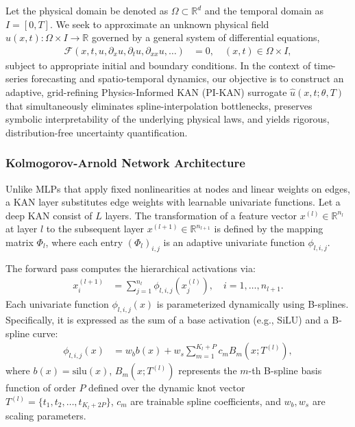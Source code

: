 \documentclass[10pt,twocolumn]{article}
\begin{document}
Let the physical domain be denoted as $\Omega \subset \mathbb{R}^d$ and the temporal domain as $I = [0, T]$. We seek to approximate an unknown physical field $u(x, t): \Omega \times I \to \mathbb{R}$ governed by a general system of differential equations,
\begin{equation}
\begin{aligned}
\mathcal{F}\left( x, t, u, \partial_x u, \partial_t u, \partial_{xx} u, \dots \right) &= 0, 
\quad (x,t) \in \Omega \times I,
\end{aligned}
\end{equation}
subject to appropriate initial and boundary conditions. In the context of time-series forecasting and spatio-temporal dynamics, our objective is to construct an adaptive, grid-refining Physics-Informed KAN (PI-KAN) surrogate $\hat{u}(x, t; \theta, T)$ that simultaneously eliminates spline-interpolation bottlenecks, preserves symbolic interpretability of the underlying physical laws, and yields rigorous, distribution-free uncertainty quantification.

\subsubsection{Kolmogorov-Arnold Network Architecture}
Unlike MLPs that apply fixed nonlinearities at nodes and linear weights on edges, a KAN layer substitutes edge weights with learnable univariate functions. Let a deep KAN consist of $L$ layers. The transformation of a feature vector $x^{(l)} \in \mathbb{R}^{n_l}$ at layer $l$ to the subsequent layer $x^{(l+1)} \in \mathbb{R}^{n_{l+1}}$ is defined by the mapping matrix $\Phi_l$, where each entry $(\Phi_l)_{i,j}$ is an adaptive univariate function $\phi_{l,i,j}$. 

The forward pass computes the hierarchical activations via:
\begin{equation}
\begin{aligned}
x_i^{(l+1)} &= \sum_{j=1}^{n_l} \phi_{l,i,j}\left(x_j^{(l)}\right), 
\quad i = 1, \dots, n_{l+1}.
\end{aligned}
\end{equation}
Each univariate function $\phi_{l,i,j}(x)$ is parameterized dynamically using B-splines. Specifically, it is expressed as the sum of a base activation (e.g., SiLU) and a B-spline curve:
\begin{equation}
\begin{aligned}
\phi_{l,i,j}(x) &= w_b b(x) + w_s \sum_{m=1}^{K_l + P} c_{m} B_m(x; T^{(l)}),
\end{aligned}
\end{equation}
where $b(x) = \text{silu}(x)$, $B_m(x; T^{(l)})$ represents the $m$-th B-spline basis function of order $P$ defined over the dynamic knot vector $T^{(l)} = \{t_1, t_2, \dots, t_{K_l+2P}\}$, $c_m$ are trainable spline coefficients, and $w_b, w_s$ are scaling parameters.
\end{document}
